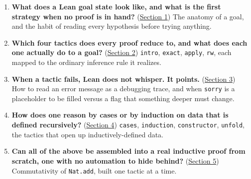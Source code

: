 \begin{enumerate}
\def\labelenumi{\arabic{enumi}.}
\tightlist
\item
  \textbf{What does a Lean goal state look like, and what is the first strategy when no proof is in hand?} (\hyperref[sec:04-tactics:01-goal-state:1]{Section 1}) The anatomy of a goal, and the habit of reading every hypothesis before trying anything.
\item
  \textbf{Which four tactics does every proof reduce to, and what does each one actually do to a goal?} (\hyperref[sec:04-tactics:02-core-tactics:1]{Section 2}) \texttt{intro}, \texttt{exact}, \texttt{apply}, \texttt{rw}, each mapped to the ordinary inference rule it realizes.
\item
  \textbf{When a tactic fails, Lean does not whisper. It points.} (\hyperref[sec:04-tactics:03-reading-failures:1]{Section 3}) How to read an error message as a debugging trace, and when \texttt{sorry} is a placeholder to be filled versus a flag that something deeper must change.
\item
  \textbf{How does one reason by cases or by induction on data that is defined recursively?} (\hyperref[sec:04-tactics:04-more-tactics:1]{Section 4}) \texttt{cases}, \texttt{induction}, \texttt{constructor}, \texttt{unfold}, the tactics that open up inductively-defined data.
\item
  \textbf{Can all of the above be assembled into a real inductive proof from scratch, one with no automation to hide behind?} (\hyperref[sec:04-tactics:05-worked-example:1]{Section 5}) Commutativity of \texttt{Nat.add}, built one tactic at a time.
\end{enumerate}








